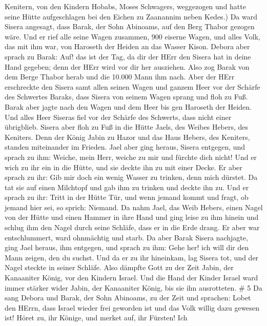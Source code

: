 Kenitern, von den Kindern Hobabs, Moses Schwagers, weggezogen und hatte
seine Hütte aufgeschlagen bei den Eichen zu Zaanannim neben Kedes.)
 Da ward Sisera angesagt, dass Barak, der Sohn Abinoams,
auf den Berg Thabor gezogen wäre.  Und er rief alle seine
Wagen zusammen, 900 eiserne Wagen, und alles Volk, das mit ihm war, von
Haroseth der Heiden an das Wasser Kison.  Debora aber
sprach zu Barak: Auf! das ist der Tag, da dir der HErr den Sisera hat in
deine Hand gegeben; denn der HErr wird vor dir her ausziehen. Also zog
Barak von dem Berge Thabor herab und die 10.000 Mann ihm nach.
 Aber der HErr erschreckte den Sisera samt allen seinen
Wagen und ganzem Heer vor der Schärfe des Schwertes Baraks, dass Sisera
von seinem Wagen sprang und floh zu Fuß.  Barak aber jagte
nach den Wagen und dem Heer bis gen Haroseth der Heiden. Und alles Heer
Siseras fiel vor der Schärfe des Schwerts, dass nicht einer übrigblieb.
 Sisera aber floh zu Fuß in die Hütte Jaels, des Weibes
Hebers, des Keniters. Denn der König Jabin zu Hazor und das Haus Hebers,
des Keniters, standen miteinander im Frieden.  Jael aber
ging heraus, Sisera entgegen, und sprach zu ihm: Weiche, mein Herr,
weiche zu mir und fürchte dich nicht! Und er wich zu ihr ein in die
Hütte, und sie deckte ihn zu mit einer Decke.  Er aber
sprach zu ihr: Gib mir doch ein wenig Wasser zu trinken, denn mich
dürstet. Da tat sie auf einen Milchtopf und gab ihm zu trinken und
deckte ihn zu.  Und er sprach zu ihr: Tritt in der Hütte
Tür, und wenn jemand kommt und fragt, ob jemand hier sei, so sprich:
Niemand.  Da nahm Jael, das Weib Hebers, einen Nagel von
der Hütte und einen Hammer in ihre Hand und ging leise zu ihm hinein und
schlug ihm den Nagel durch seine Schläfe, dass er in die Erde drang. Er
aber war entschlummert, ward ohnmächtig und starb.  Da aber
Barak Sisera nachjagte, ging Jael heraus, ihm entgegen, und sprach zu
ihm: Gehe her! ich will dir den Mann zeigen, den du suchst. Und da er zu
ihr hineinkam, lag Sisera tot, und der Nagel steckte in seiner Schläfe.
 Also dämpfte Gott zu der Zeit Jabin, der Kanaaniter König,
vor den Kindern Israel.  Und die Hand der Kinder Israel
ward immer stärker wider Jabin, der Kanaaniter König, bis sie ihn
ausrotteten. \# 5  Da sang Debora und Barak, der Sohn
Abinoams, zu der Zeit und sprachen:  Lobet den HErrn, dass
Israel wieder frei geworden ist und das Volk willig dazu gewesen ist!
 Höret zu, ihr Könige, und merket auf, ihr Fürsten! Ich
